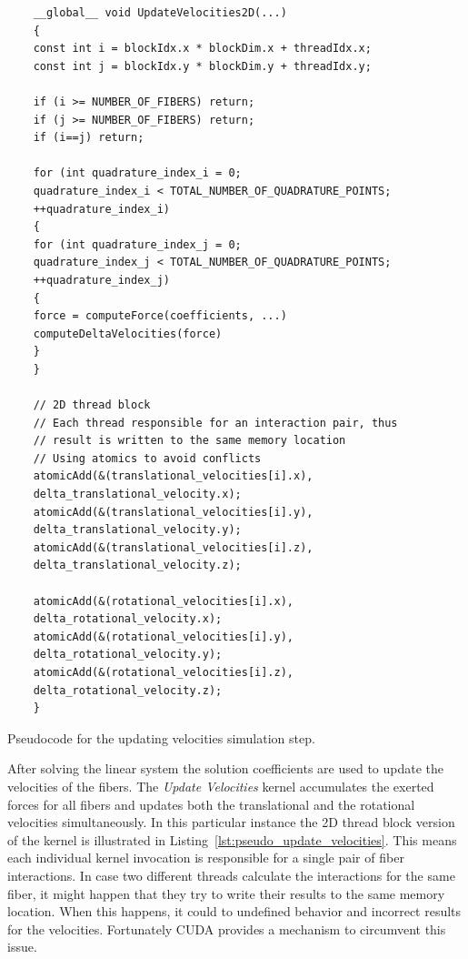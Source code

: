 \begin{listing}[!htbp]
  \centering
  \begin{verbatim}
    __global__ void UpdateVelocities2D(...)
    {
    const int i = blockIdx.x * blockDim.x + threadIdx.x;
    const int j = blockIdx.y * blockDim.y + threadIdx.y;

    if (i >= NUMBER_OF_FIBERS) return;
    if (j >= NUMBER_OF_FIBERS) return;
    if (i==j) return;

    for (int quadrature_index_i = 0;
    quadrature_index_i < TOTAL_NUMBER_OF_QUADRATURE_POINTS;
    ++quadrature_index_i)
    {
    for (int quadrature_index_j = 0;
    quadrature_index_j < TOTAL_NUMBER_OF_QUADRATURE_POINTS;
    ++quadrature_index_j)
    {
    force = computeForce(coefficients, ...)
    computeDeltaVelocities(force)
    }
    }

    // 2D thread block
    // Each thread responsible for an interaction pair, thus
    // result is written to the same memory location
    // Using atomics to avoid conflicts
    atomicAdd(&(translational_velocities[i].x),
    delta_translational_velocity.x);
    atomicAdd(&(translational_velocities[i].y),
    delta_translational_velocity.y);
    atomicAdd(&(translational_velocities[i].z),
    delta_translational_velocity.z);

    atomicAdd(&(rotational_velocities[i].x),
    delta_rotational_velocity.x);
    atomicAdd(&(rotational_velocities[i].y),
    delta_rotational_velocity.y);
    atomicAdd(&(rotational_velocities[i].z),
    delta_rotational_velocity.z);
    }
  \end{verbatim}
  \caption{Pseudocode for the updating velocities simulation step.}
  \label{lst:pseudo_update_velocities}
\end{listing}

After solving the linear system the solution coefficients are used to update the velocities of the fibers. The \emph{Update Velocities} kernel accumulates the exerted forces for all fibers and updates both the translational and the rotational velocities simultaneously. In this particular instance the 2D thread block version of the kernel is illustrated in Listing~\ref{lst:pseudo_update_velocities}. This means each individual kernel invocation is responsible for a single pair of fiber interactions. In case two different threads calculate the interactions for the same fiber, it might happen that they try to write their results to the same memory location. When this happens, it could to undefined behavior and incorrect results for the velocities. Fortunately CUDA provides a mechanism to circumvent this issue.


